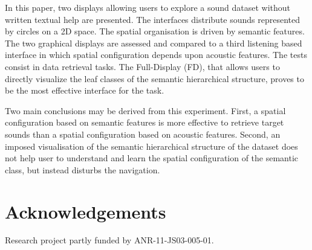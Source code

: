 \documentclass{aes2e}
\begin{document}
In this paper, two displays allowing users to explore a sound dataset without written textual help are presented. The interfaces distribute sounds represented by circles on a 2D space. The spatial organisation is driven by semantic features. The two graphical displays are assessed and compared to a third listening based interface in which spatial configuration depends upon acoustic features. The tests consist in data retrieval tasks. 
The Full-Display (FD), that allows users to directly visualize the leaf classes of the semantic hierarchical structure, proves to be the most effective interface for the task.

Two main conclusions may be derived from this experiment. First, a spatial configuration based on semantic features is more effective to retrieve target sounds than a spatial configuration based on acoustic features. Second, an imposed visualisation of the semantic hierarchical structure of the dataset does not help user to understand and learn the spatial configuration of the semantic class, but instead disturbs the navigation. 


%


\section{Acknowledgements}

Research project partly funded by ANR-11-JS03-005-01.



%
%
\end{document}
